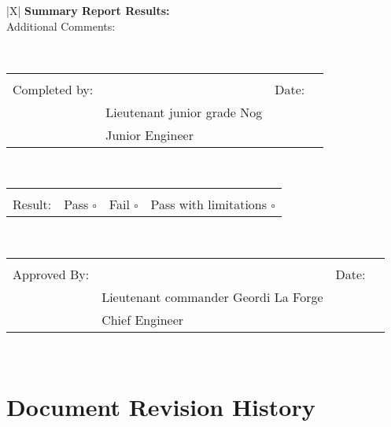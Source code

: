 \documentclass[a4paper,12pt]{article}
\def\arraystretch{1.5}%
\begin{document}
\noindent\bgroup
\def\arraystretch{1.5}%
\begin{tabularx}{\textwidth}{|X|}
	\hline
	\textbf{Summary Report Results:} \\  \hline
	Additional Comments:             \\ \rule{0pt}{12ex}     \\ \hline


	\bgroup
	\def\arraystretch{1.1}%
	\begin{tabular}{@{}p{0.98in}p{3.2in}p{0.3in}p{1.4in}@{}}
		\rule{0pt}{3ex}                                                  \\
		Completed by: & \hrulefill                  & Date: & \hrulefill \\
		              & Lieutenant junior grade Nog &       &            \\
		              & Junior Engineer             &       &            \\
	\end{tabular}
	\egroup
	\\ \hline


	\bgroup
	\def\arraystretch{1.1}%
	\begin{tabular}{@{}p{0.98in}p{1.45in}p{1.45in}p{1.6in}@{}}
		\rule{0pt}{.5ex}                                 \\ Result: &
		Pass $\square$ &
		Fail $\square$ &
		Pass with limitations $\square$ \rule{0pt}{.5ex} \\
	\end{tabular}
	\egroup
	\\ \hline



	\bgroup
	\def\arraystretch{1.1}%
	\begin{tabular}{@{}p{0.98in}p{3.2in}p{0.3in}p{1.4in}@{}}
		\rule{0pt}{3ex}                                                          \\
		Approved By: & \hrulefill                           & Date: & \hrulefill \\
		             & Lieutenant commander Geordi La Forge &       &            \\
		             & Chief Engineer                       &       &            \\
	\end{tabular}
	\egroup
	\\ \hline
\end{tabularx}
\egroup


\section{Document Revision History}
\end{document}

